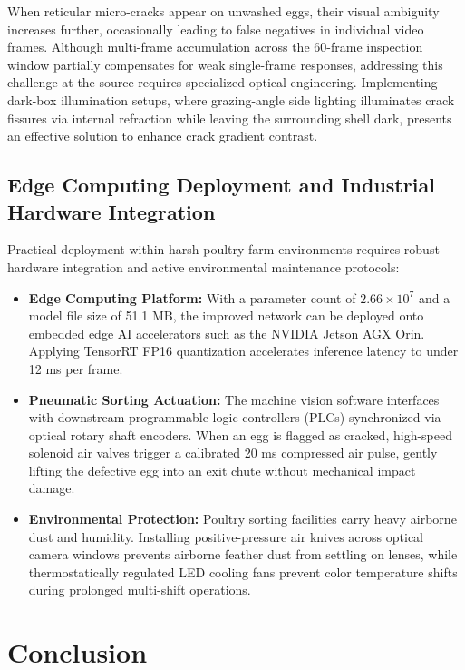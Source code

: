 \documentclass[12pt,a4paper]{report}
\begin{document}
When reticular micro-cracks appear on unwashed eggs, their visual ambiguity increases further, occasionally leading to false negatives in individual video frames. Although multi-frame accumulation across the 60-frame inspection window partially compensates for weak single-frame responses, addressing this challenge at the source requires specialized optical engineering. Implementing dark-box illumination setups, where grazing-angle side lighting illuminates crack fissures via internal refraction while leaving the surrounding shell dark, presents an effective solution to enhance crack gradient contrast.

\section{Edge Computing Deployment and Industrial Hardware Integration}

Practical deployment within harsh poultry farm environments requires robust hardware integration and active environmental maintenance protocols:
\begin{itemize}
    \item \textbf{Edge Computing Platform:} With a parameter count of $2.66 \times 10^7$ and a model file size of 51.1 MB, the improved network can be deployed onto embedded edge AI accelerators such as the NVIDIA Jetson AGX Orin. Applying TensorRT FP16 quantization accelerates inference latency to under 12 ms per frame.
    \item \textbf{Pneumatic Sorting Actuation:} The machine vision software interfaces with downstream programmable logic controllers (PLCs) synchronized via optical rotary shaft encoders. When an egg is flagged as cracked, high-speed solenoid air valves trigger a calibrated 20 ms compressed air pulse, gently lifting the defective egg into an exit chute without mechanical impact damage.
    \item \textbf{Environmental Protection:} Poultry sorting facilities carry heavy airborne dust and humidity. Installing positive-pressure air knives across optical camera windows prevents airborne feather dust from settling on lenses, while thermostatically regulated LED cooling fans prevent color temperature shifts during prolonged multi-shift operations.
\end{itemize}


\chapter{Conclusion}
\end{document}

